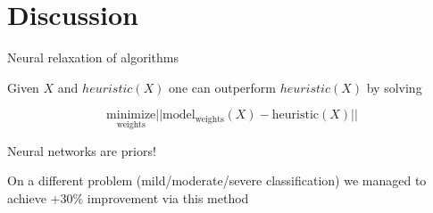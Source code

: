 \documentclass[pdf]{beamer}
\newcommand{\?}{\ensuremath{^\texttt{\bf [CITATION~NEEDED]}}}
\begin{document}
\section{Discussion}

\begin{frame}{Neural relaxation of algorithms}

Given $X$ and $heuristic(X)$ one can outperform $heuristic(X)$ by solving

\begin{equation}
\underset{\text{weights}}{\text{minimize}} ||\text{model}_{\text{weights}}(X) - \text{heuristic}(X)||
\end{equation} 

\pause

\alert{Neural networks are priors!}

On a different problem (mild/moderate/severe classification) we managed to achieve +30\% improvement via this method

\end{frame}
\end{document}
